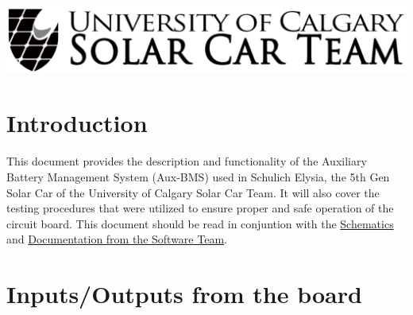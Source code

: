\begin{titlepage}
    \includegraphics[width=\textwidth]{../../Images/Logos/logo-wide.png}\\[1cm] %
     
    
    \vfill %
  
  \end{titlepage}
  
  
  \tableofcontents
  \listoffigures
  \listoftables
  
  
  \section{Introduction}
  This document provides the description and functionality of the Auxiliary Battery Management System (Aux-BMS) used in Schulich Elysia, the 5th Gen Solar Car of the University of Calgary Solar Car Team.
  It will also cover the testing procedures that were utilized to ensure proper and safe operation of the circuit board.
  This document should be read in conjuntion with the \href{https://drive.google.com/drive/u/0/folders/1RuRFeXCH_df2QL6o7zRyYeLvdto-ttc6}{Schematics} and \href{https://github.com/UCSolarCarTeam/Epsilon-Embedded-Software/blob/master/Documentation/AuxBMS.adoc?fbclid=IwAR172uMpHtL8X5OH7NzIacaADQOfsAcYtxaQmT-veKxzl1v6rAvSl-hSCcg}{Documentation from the Software Team}.
  
  \section{Inputs/Outputs from the board}


